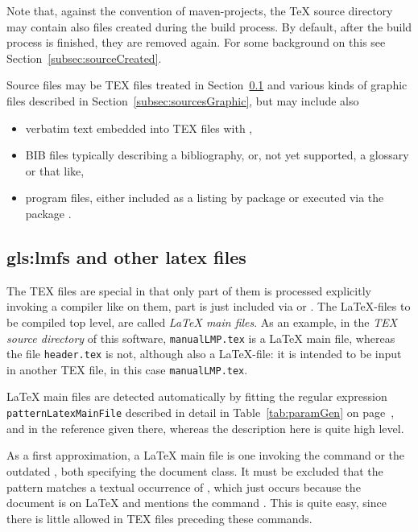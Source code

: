 Note that, against the convention of maven-projects, 
the \TeX{} source directory may contain also files created during the build process. 
By default, after the build process is finished, they are removed again. 
For some background on this see Section~\ref{subsec:sourceCreated}. 

Source files may be TEX files treated in Section~\ref{subsec:sourcesLatex} 
and various kinds of graphic files described in Section~\ref{subsec:sourcesGraphic}, 
but may include also 
%
\begin{itemize}
\item 
verbatim text embedded into TEX files with , 
\item 
BIB files typically describing a bibliography,  or, %
not yet supported, a glossary or that like, %
\item 
program files, either included as a listing by package  
or executed via the package . %
\end{itemize}


\subsection{\texorpdfstring{\glspl{gls:lmf}}{LaTeX main files} and other latex files}
\label{subsec:sourcesLatex}

The TEX files are special in that only part of them is processed explicitly 
invoking a compiler like \lualatex{} on them, 
part is just included via  or . 
The \LaTeX-files to be compiled top level, 
are called \emph{\LaTeX{} main files}. 
As an example, 
in the \emph{TEX source directory} of this software, 
\texttt{manualLMP.tex} is a \LaTeX{} main file, 
whereas the file \texttt{header.tex} is not, although also a \LaTeX-file: 
it is intended to be input in another TEX file, in this case \texttt{manualLMP.tex}. 


\LaTeX{} main files are detected automatically 
by fitting the regular expression \texttt{patternLatexMainFile} 
described in detail in Table~\ref{tab:paramGen} on page~\pageref{tab:paramGen}, 
and in the reference given there, 
whereas the description here is quite high level. 

As a first approximation, a \LaTeX{} main file is one invoking 
the command  
or the outdated , both specifying the document class. 
It must be excluded that the pattern matches a textual occurrence of , 
which just occurs because the document is on \LaTeX{} 
and mentions the command . 
This is quite easy, since there is little allowed in TEX files preceding these commands. 

